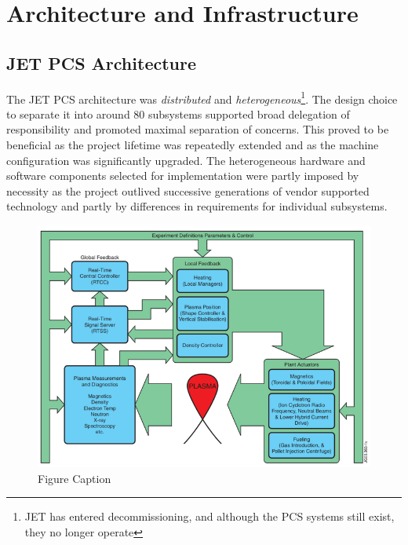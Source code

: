 \documentclass[preprint,12pt]{elsarticle}
\begin{document}
\section{Architecture and Infrastructure}

\subsection{JET PCS Architecture}

The JET PCS architecture was
{\em distributed} and {\em heterogeneous}\footnote{JET has entered decommissioning, and although the PCS systems still exist, they no longer operate}.  
The design choice to separate it into around 80 subsystems supported broad delegation of responsibility and
promoted maximal separation of concerns. This proved to be beneficial as the project lifetime was repeatedly extended and as the machine configuration was 
significantly upgraded.  The heterogeneous hardware and software components selected for implementation were partly imposed by necessity as the project outlived successive generations of vendor supported  technology and partly by differences in requirements for individual subsystems.

\begin{figure}[t]%
\centering%
	\includegraphics{JG_Felton}
\vspace{1.5in}
\caption{Figure Caption}\label{fig1}
\end{figure}
\end{document}
